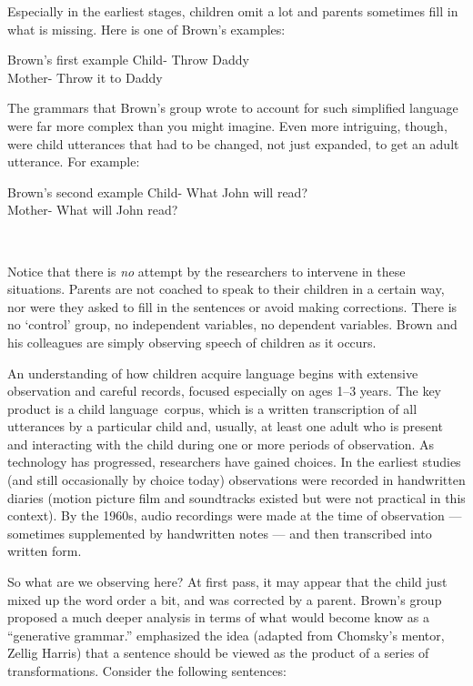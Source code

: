 \begin{refsection}
Especially in the earliest stages, children omit a lot and parents sometimes fill in what is missing. Here is one of Brown's examples:

\begin{apatextbox}{Brown's first example}
Child- Throw Daddy \\
Mother- Throw it to Daddy
\end{apatextbox}

The grammars that Brown's group wrote to account for such simplified language were far more complex than you might imagine. Even more intriguing, though, were child utterances that had to be changed, not just expanded, to get an adult utterance. For example:

\begin{apatextbox}{Brown's second example}
Child- What John will read? \\
Mother- What will John read? 
\end{apatextbox}~\citep{Brown:1968df}

Notice that there is \emph{no} attempt by the researchers to intervene in these situations. Parents are not coached to speak to their children in a certain way, nor were they asked to fill in the sentences or avoid making corrections. There is no `control' group, no independent variables, no dependent variables. Brown and his colleagues are simply observing speech of children as it occurs.

An understanding of how children acquire language begins with extensive observation and careful records, focused especially on ages 1--3 years. The key product is a child language corpus, which is a written transcription of all utterances by a particular child and, usually, at least one adult who is present and interacting with the child during one or more periods of observation. As technology has progressed, researchers have gained choices. In the earliest studies (and still occasionally by choice today) observations were recorded in handwritten diaries (motion picture film and soundtracks existed but were not practical in this context). By the 1960s, audio recordings were made at the time of observation --- sometimes supplemented by handwritten notes --- and then transcribed into written form. 

So what are we observing here? At first pass, it may appear that the child just mixed up the word order a bit, and was corrected by a parent. Brown's group proposed a much deeper analysis in terms of what would become know as a ``generative grammar.''
 emphasized the idea (adapted from Chomsky's mentor, Zellig Harris) that a sentence should be viewed as the product of a series of transformations. Consider the following sentences:


\end{refsection}
